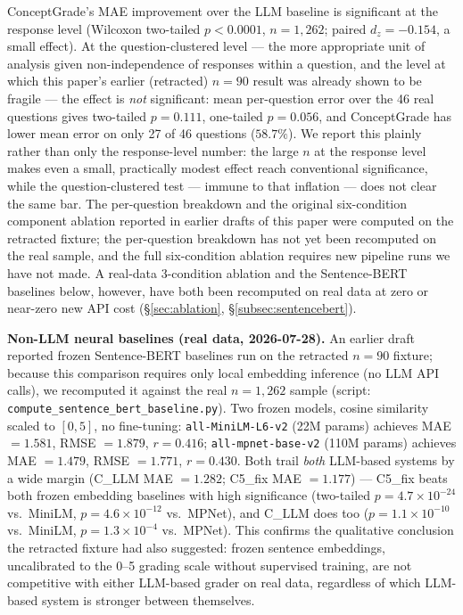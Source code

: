 \documentclass[conference]{IEEEtran}
\begin{document}
ConceptGrade's MAE improvement over the LLM baseline is significant at the
response level (Wilcoxon two-tailed $p<0.0001$, $n=1{,}262$; paired
$d_z=-0.154$, a small effect). At the question-clustered level ---
the more appropriate unit of analysis given non-independence of responses
within a question, and the level at which this paper's earlier
(retracted) $n=90$ result was already shown to be fragile --- the effect
is \emph{not} significant: mean per-question error over the 46 real
questions gives two-tailed $p=0.111$, one-tailed $p=0.056$, and
ConceptGrade has lower mean error on only 27 of 46 questions ($58.7\%$).
We report this plainly rather than only the response-level number: the
large $n$ at the response level makes even a small, practically modest
effect reach conventional significance, while the question-clustered
test --- immune to that inflation --- does not clear the same bar. The
per-question breakdown and the original six-condition component ablation
reported in earlier drafts of this paper were computed on the retracted
fixture; the per-question breakdown has not yet been recomputed on the
real sample, and the full six-condition ablation requires new pipeline
runs we have not made. A real-data 3-condition ablation and the
Sentence-BERT baselines below, however, have both been recomputed on
real data at zero or near-zero new API cost (\S\ref{sec:ablation},
\S\ref{subsec:sentencebert}).

\textbf{Non-LLM neural baselines (real data, 2026-07-28).}
\label{subsec:sentencebert}
An earlier draft reported frozen Sentence-BERT baselines run on the
retracted $n=90$ fixture; because this comparison requires only local
embedding inference (no LLM API calls), we recomputed it against the
real $n=1{,}262$ sample (script: \texttt{compute\_sentence\_bert\_baseline.py}).
Two frozen models, cosine similarity scaled to $[0,5]$, no fine-tuning:
\texttt{all-MiniLM-L6-v2} (22M params) achieves MAE $=1.581$, RMSE $=1.879$,
$r=0.416$; \texttt{all-mpnet-base-v2} (110M params) achieves MAE
$=1.479$, RMSE $=1.771$, $r=0.430$. Both trail \emph{both} LLM-based
systems by a wide margin (C\_LLM MAE $=1.282$; C5\_fix MAE $=1.177$) ---
C5\_fix beats both frozen embedding baselines with high significance
(two-tailed $p=4.7\times10^{-24}$ vs.\ MiniLM, $p=4.6\times10^{-12}$
vs.\ MPNet), and C\_LLM does too ($p=1.1\times10^{-10}$ vs.\ MiniLM,
$p=1.3\times10^{-4}$ vs.\ MPNet). This confirms the qualitative
conclusion the retracted fixture had also suggested: frozen sentence
embeddings, uncalibrated to the 0--5 grading scale without supervised
training, are not competitive with either LLM-based grader on real
data, regardless of which LLM-based system is stronger between
themselves.
\end{document}
